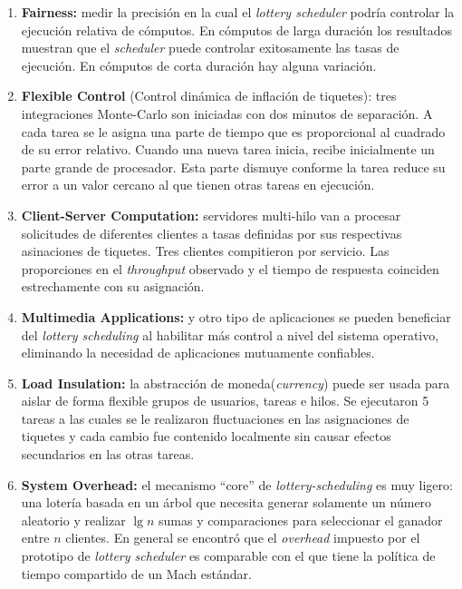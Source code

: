 \begin{enumerate}
    \item \textbf{Fairness:} medir la precisión en la cual el \textit{lottery scheduler} podría controlar la ejecución relativa de cómputos. En cómputos de larga duración los resultados muestran que el \textit{scheduler} puede controlar exitosamente las tasas de ejecución. En cómputos de corta duración hay alguna variación. 
    \item \textbf{Flexible Control} (Control dinámica de inflación de tiquetes): tres integraciones Monte-Carlo son iniciadas con dos minutos de separación. A cada tarea se le asigna una parte de tiempo que es proporcional al cuadrado de su error relativo. Cuando una nueva tarea inicia, recibe inicialmente un parte grande de procesador. Esta parte dismuye conforme la tarea reduce su error a un valor cercano al que tienen otras tareas en ejecución.
    \item \textbf{Client-Server Computation:} servidores multi-hilo van a procesar solicitudes de diferentes clientes a tasas definidas por sus respectivas asinaciones de tiquetes. Tres clientes compitieron por servicio. Las proporciones en el \textit{throughput} observado y el tiempo de respuesta coinciden estrechamente con su asignación.
    \item \textbf{Multimedia Applications:} y otro tipo de aplicaciones se pueden beneficiar del \textit{lottery scheduling} al habilitar más control a nivel del sistema operativo, eliminando la necesidad de aplicaciones mutuamente confiables. 
    \item \textbf{Load Insulation:} la abstracción de moneda(\textit{currency}) puede ser usada para aislar de forma flexible grupos de usuarios, tareas e hilos. Se ejecutaron 5 tareas a las cuales se le realizaron fluctuaciones en las asignaciones de tiquetes y cada cambio fue contenido localmente sin causar efectos secundarios en las otras tareas.
    \item \textbf{System Overhead:} el mecanismo ``core'' de \textit{lottery-scheduling} es muy ligero: una lotería basada en un árbol que necesita generar solamente un número aleatorio y realizar $\lg n$ sumas y comparaciones para seleccionar el ganador entre $n$ clientes. En general se encontró que el \textit{overhead} impuesto por el prototipo de \textit{lottery scheduler} es comparable con el que tiene la política de tiempo compartido de un Mach estándar. 
\end{enumerate}




















